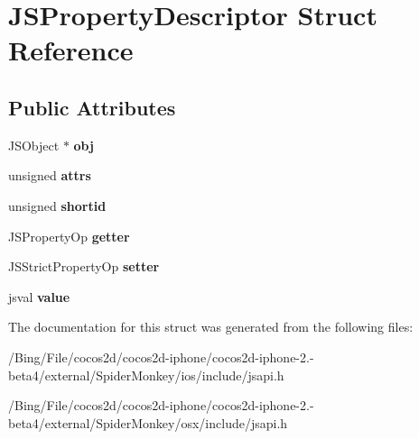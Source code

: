 \hypertarget{struct_j_s_property_descriptor}{\section{J\-S\-Property\-Descriptor Struct Reference}
\label{struct_j_s_property_descriptor}
}
\subsection*{Public Attributes}
\begin{DoxyCompactItemize}
\item 
\hypertarget{struct_j_s_property_descriptor_a87dc163965163a3af7295252267c4dbf}{J\-S\-Object $\ast$ {\bfseries obj}}\label{struct_j_s_property_descriptor_a87dc163965163a3af7295252267c4dbf}

\item 
\hypertarget{struct_j_s_property_descriptor_a7116851c5b0691829baedaf66955f099}{unsigned {\bfseries attrs}}\label{struct_j_s_property_descriptor_a7116851c5b0691829baedaf66955f099}

\item 
\hypertarget{struct_j_s_property_descriptor_add90e4a22d092b3eb1e5a96f6183026a}{unsigned {\bfseries shortid}}\label{struct_j_s_property_descriptor_add90e4a22d092b3eb1e5a96f6183026a}

\item 
\hypertarget{struct_j_s_property_descriptor_aa0a72fa4a444744d796df7dcc1679c54}{J\-S\-Property\-Op {\bfseries getter}}\label{struct_j_s_property_descriptor_aa0a72fa4a444744d796df7dcc1679c54}

\item 
\hypertarget{struct_j_s_property_descriptor_a2479979a63fdaf991ed121bcea7921b1}{J\-S\-Strict\-Property\-Op {\bfseries setter}}\label{struct_j_s_property_descriptor_a2479979a63fdaf991ed121bcea7921b1}

\item 
\hypertarget{struct_j_s_property_descriptor_a40f1805c7fc6dfbd33b9c631a5def9ec}{jsval {\bfseries value}}\label{struct_j_s_property_descriptor_a40f1805c7fc6dfbd33b9c631a5def9ec}

\end{DoxyCompactItemize}


The documentation for this struct was generated from the following files\-:\begin{DoxyCompactItemize}
\item 
/\-Bing/\-File/cocos2d/cocos2d-\/iphone/cocos2d-\/iphone-\/2.-\/beta4/external/\-Spider\-Monkey/ios/include/jsapi.\-h\item 
/\-Bing/\-File/cocos2d/cocos2d-\/iphone/cocos2d-\/iphone-\/2.-\/beta4/external/\-Spider\-Monkey/osx/include/jsapi.\-h\end{DoxyCompactItemize}
